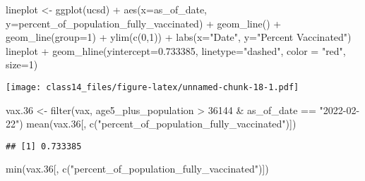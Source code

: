 \documentclass[
]{article}
\newenvironment{Shaded}{\begin{snugshade}}{\end{snugshade}}
\newcommand{\AttributeTok}[1]{\textcolor[rgb]{0.77,0.63,0.00}{#1}}
\newcommand{\DecValTok}[1]{\textcolor[rgb]{0.00,0.00,0.81}{#1}}
\newcommand{\FloatTok}[1]{\textcolor[rgb]{0.00,0.00,0.81}{#1}}
\newcommand{\FunctionTok}[1]{\textcolor[rgb]{0.00,0.00,0.00}{#1}}
\newcommand{\NormalTok}[1]{#1}
\newcommand{\OtherTok}[1]{\textcolor[rgb]{0.56,0.35,0.01}{#1}}
\newcommand{\SpecialCharTok}[1]{\textcolor[rgb]{0.00,0.00,0.00}{#1}}
\newcommand{\StringTok}[1]{\textcolor[rgb]{0.31,0.60,0.02}{#1}}
\begin{document}
\begin{Shaded}
\begin{Highlighting}[]
\NormalTok{lineplot }\OtherTok{\textless{}{-}} \FunctionTok{ggplot}\NormalTok{(ucsd) }\SpecialCharTok{+}
  \FunctionTok{aes}\NormalTok{(}\AttributeTok{x=}\NormalTok{as\_of\_date, }\AttributeTok{y=}\NormalTok{percent\_of\_population\_fully\_vaccinated) }\SpecialCharTok{+}
  \FunctionTok{geom\_line}\NormalTok{() }\SpecialCharTok{+}
  \FunctionTok{geom\_line}\NormalTok{(}\AttributeTok{group=}\DecValTok{1}\NormalTok{) }\SpecialCharTok{+}
  \FunctionTok{ylim}\NormalTok{(}\FunctionTok{c}\NormalTok{(}\DecValTok{0}\NormalTok{,}\DecValTok{1}\NormalTok{)) }\SpecialCharTok{+}
  \FunctionTok{labs}\NormalTok{(}\AttributeTok{x=}\StringTok{"Date"}\NormalTok{, }\AttributeTok{y=}\StringTok{"Percent Vaccinated"}\NormalTok{) }
\NormalTok{lineplot }\SpecialCharTok{+} \FunctionTok{geom\_hline}\NormalTok{(}\AttributeTok{yintercept=}\FloatTok{0.733385}\NormalTok{, }\AttributeTok{linetype=}\StringTok{"dashed"}\NormalTok{, }
                \AttributeTok{color =} \StringTok{"red"}\NormalTok{, }\AttributeTok{size=}\DecValTok{1}\NormalTok{)}
\end{Highlighting}
\end{Shaded}

\texttt{[image: class14\_files/figure-latex/unnamed-chunk-18-1.pdf]}

\begin{Shaded}
\begin{Highlighting}[]
\NormalTok{vax}\FloatTok{.36} \OtherTok{\textless{}{-}} \FunctionTok{filter}\NormalTok{(vax, age5\_plus\_population }\SpecialCharTok{\textgreater{}} \DecValTok{36144} \SpecialCharTok{\&}\NormalTok{ as\_of\_date }\SpecialCharTok{==} \StringTok{"2022{-}02{-}22"}\NormalTok{)}
\FunctionTok{mean}\NormalTok{(vax}\FloatTok{.36}\NormalTok{[, }\FunctionTok{c}\NormalTok{(}\StringTok{"percent\_of\_population\_fully\_vaccinated"}\NormalTok{)])}
\end{Highlighting}
\end{Shaded}

\begin{verbatim}
## [1] 0.733385
\end{verbatim}

\begin{Shaded}
\begin{Highlighting}[]
\FunctionTok{min}\NormalTok{(vax}\FloatTok{.36}\NormalTok{[, }\FunctionTok{c}\NormalTok{(}\StringTok{"percent\_of\_population\_fully\_vaccinated"}\NormalTok{)])}
\end{Highlighting}
\end{Shaded}
\end{document}
